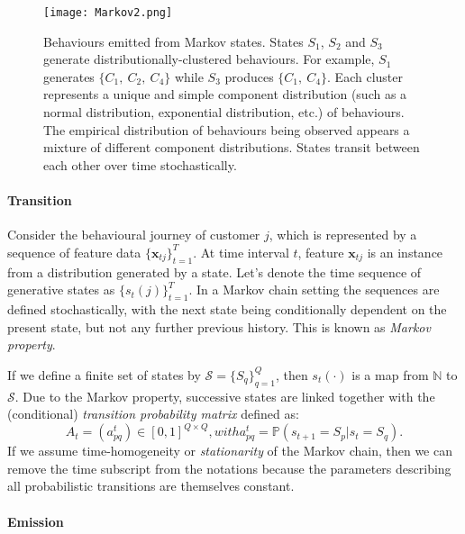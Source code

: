 \begin{figure}[!h]
\centering
\texttt{[image: Markov2.png]}
\caption{Behaviours emitted from Markov states. States $S_1$, $S_2$ and $S_3$ generate distributionally-clustered behaviours. For example, $S_1$ generates $\{ C_1, ~C_2, ~C_4\}$ while $S_3$ produces $\{ C_1, ~C_4\}$. Each cluster represents a unique and simple component distribution (such as a normal distribution, exponential distribution, etc.) of behaviours. The empirical distribution of behaviours being observed appears a mixture of different component distributions. States transit between each other over time stochastically.}
\label{fig:markovChain}
\end{figure}

\paragraph*{Transition}

Consider the behavioural journey of customer $j$, which is represented by a sequence of feature data $\{ \mathbf{x}_{tj} \}_{t=1}^{T}$. At time interval $t$, feature $\mathbf{x}_{tj}$ is an instance from a distribution generated by a state. Let's denote the time sequence of generative states as $\{ s_{t}(j) \}_{t=1}^{T}$. In a Markov chain setting the sequences are defined stochastically, with the next state being conditionally dependent on the present state, but not any further previous history. This is known as \textit{Markov property}. 

If we define a finite set of states by $\mathcal{S} = \{ S_q \}_{q=1}^Q$, then $s_t (\cdot)$ is a map from $\mathbb{N}$ to $\mathcal{S}$. Due to the Markov property, successive states are linked together with the (conditional) \textit{transition probability matrix} defined as:
\begin{subequations}
\begin{equation}
A_t = (a_{pq}^t) \in [0,1]^{Q \times Q}, 
\end{equation}
with
\begin{equation}
a_{pq}^t = \mathbb{P} \left( s_{t+1} = S_p | s_t = S_q \right).
\end{equation}
\label{eq:transition}
\end{subequations}
If we assume time-homogeneity or \textit{stationarity} of the Markov chain, then we can remove the time subscript from the notations because the parameters describing all probabilistic transitions are themselves constant.

\paragraph*{Emission}
\label{sec:emission}

